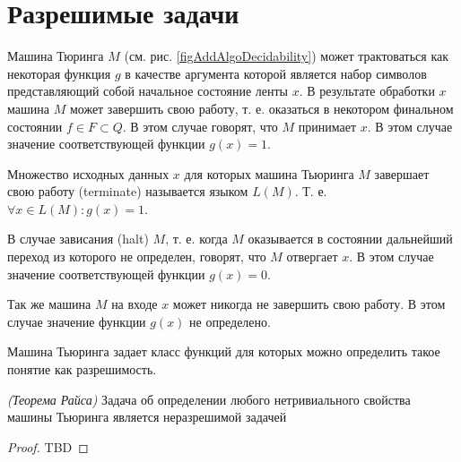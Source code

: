 \section{Разрешимые задачи}

Машина Тюринга $M$ (см. рис. \ref{figAddAlgoDecidability}) может
трактоваться как некоторая функция $g$ в качестве 
аргумента которой является набор символов представляющий собой
начальное состояние ленты $x$. В результате обработки $x$ машина $M$
может завершить свою работу, т. е. оказаться в некотором финальном
состоянии $f \in F \subset Q$. В этом случае говорят, что $M$
принимает $x$. В этом случае значение соответствующей функции 
$g(x) = 1$. 

\begin{definition}
Множество исходных данных $x$ для которых машина Тьюринга $M$ завершает
свою работу (terminate) называется языком $L\left(M\right)$. Т. е.  
$\forall x \in L\left(M\right): g(x) = 1$.
\end{definition}

В случае зависания (halt) $M$, т. е. когда $M$
оказывается в состоянии дальнейший переход из которого не определен,
говорят, что $M$ отвергает $x$. В этом случае значение соответствующей
функции $g(x) =0$. 

Так же машина $M$ на входе $x$ может никогда не
завершить свою работу. В этом случае значение функции $g(x)$
не определено.    

Машина Тьюринга задает класс функций для которых можно определить
такое понятие как разрешимость.



\begin{theorem}
\emph{(Теорема Райса)}
Задача об определении любого нетривиального свойства машины Тьюринга
является неразрешимой задачей
\end{theorem}

\begin{proof}
TBD
\end{proof}

